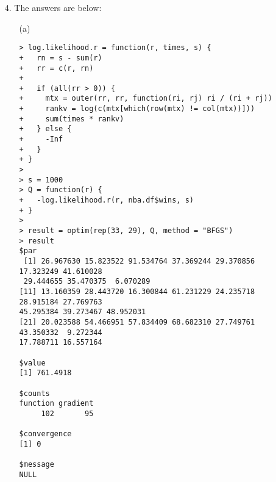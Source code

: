 \documentclass[11pt]{report}
\theoremstyle{definition}
\theoremstyle{remark}
\begin{document}
\begin{enumerate}
    \item[4.] The answers are below:
    \begin{enumerate}
    	\item[(a)] \begin{verbatim}> log.likelihood.r = function(r, times, s) {
+   rn = s - sum(r)
+   rr = c(r, rn)
+
+   if (all(rr > 0)) {
+     mtx = outer(rr, rr, function(ri, rj) ri / (ri + rj))
+     rankv = log(c(mtx[which(row(mtx) != col(mtx))]))
+     sum(times * rankv)
+   } else {
+     -Inf
+   }
+ }
>
> s = 1000
> Q = function(r) {
+   -log.likelihood.r(r, nba.df$wins, s)
+ }
>
> result = optim(rep(33, 29), Q, method = "BFGS")
> result
$par
 [1] 26.967630 15.823522 91.534764 37.369244 29.370856 17.323249 41.610028 
 29.444655 35.470375  6.070289
[11] 13.160359 28.443720 16.300844 61.231229 24.235718 28.915184 27.769763 
45.295384 39.273467 48.952031
[21] 20.023588 54.466951 57.834409 68.682310 27.749761 43.350332  9.272344 
17.788711 16.557164

$value
[1] 761.4918

$counts
function gradient
     102       95

$convergence
[1] 0

$message
NULL


\end{verbatim}
\end{enumerate}
\end{enumerate}
\end{document}
